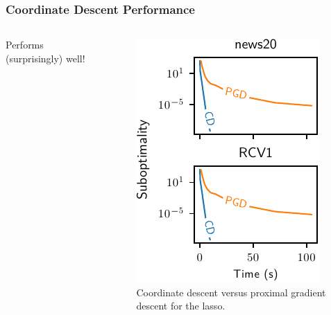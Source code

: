 \documentclass[10pt]{beamer}
\begin{document}
\begin{frame}
  \frametitle{Coordinate Descent Performance}

  \begin{columns}[c]
    \begin{column}{0.45\textwidth}
      Performs (surprisingly) well!
    \end{column}
    \begin{column}{0.45\textwidth}
      \begin{figure}[htpb]
        \centering
        \includegraphics[]{figures/paper5-cd-vs-pgd.pdf}
        \caption{%
          Coordinate descent versus proximal gradient descent for the lasso.
        }
      \end{figure}
    \end{column}
  \end{columns}
\end{frame}
\end{document}
